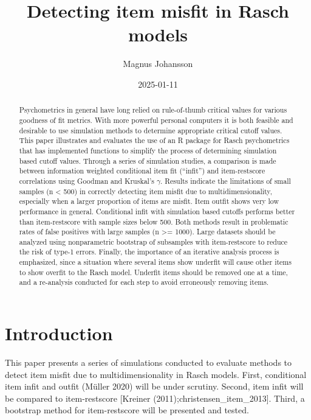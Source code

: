 \documentclass[
  letterpaper,
  DIV=11,
  numbers=noendperiod]{scrartcl}
\title{Detecting item misfit in Rasch models}
\author{Magnus Johansson}
\date{2025-01-11}
\begin{document}
\maketitle
\begin{abstract}
Psychometrics in general have long relied on rule-of-thumb critical
values for various goodness of fit metrics. With more powerful personal
computers it is both feasible and desirable to use simulation methods to
determine appropriate critical cutoff values. This paper illustrates and
evaluates the use of an R package for Rasch psychometrics that has
implemented functions to simplify the process of determining simulation
based cutoff values. Through a series of simulation studies, a
comparison is made between information weighted conditional item fit
(``infit'') and item-restscore correlations using Goodman and Kruskal's
\(\gamma\). Results indicate the limitations of small samples (n
\textless{} 500) in correctly detecting item misfit due to
multidimensionality, especially when a larger proportion of items are
misfit. Item outfit shows very low performance in general. Conditional
infit with simulation based cutoffs performs better than item-restscore
with sample sizes below 500. Both methods result in problematic rates of
false positives with large samples (n \textgreater= 1000). Large
datasets should be analyzed using nonparametric bootstrap of subsamples
with item-restscore to reduce the risk of type-1 errors. Finally, the
importance of an iterative analysis process is emphasized, since a
situation where several items show underfit will cause other items to
show overfit to the Rasch model. Underfit items should be removed one at
a time, and a re-analysis conducted for each step to avoid erroneously
removing items.
\end{abstract}


\section{Introduction}\label{introduction}

This paper presents a series of simulations conducted to evaluate
methods to detect item misfit due to multidimensionality in Rasch
models. First, conditional item infit and outfit (Müller 2020) will be
under scrutiny. Second, item infit will be compared to item-restscore
{[}Kreiner (2011);christensen\_item\_2013{]}. Third, a bootstrap method
for item-restscore will be presented and tested.
\end{document}
